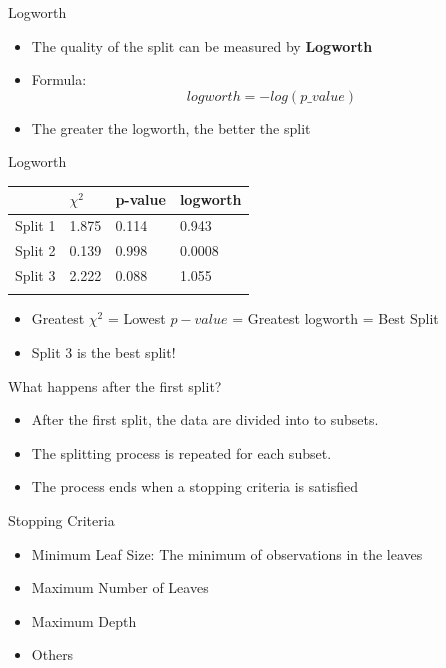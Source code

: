 \documentclass[
  ignorenonframetext,
]{beamer}
\providecommand{\tightlist}{%
  \setlength{\itemsep}{0pt}\setlength{\parskip}{0pt}}\usepackage{longtable,booktabs,array}
\begin{document}
\begin{frame}{Logworth}
\label{logworth}
\begin{itemize}
\tightlist
\item
  The quality of the split can be measured by \textbf{Logworth}
\item
  Formula: \[logworth = -log(p\text{_}value)\]
\item
  The greater the logworth, the better the split
\end{itemize}
\end{frame}

\begin{frame}{Logworth}
\label{logworth-1}
\begin{longtable}[]{@{}llll@{}}
\toprule\noalign{}
& \(\chi^2\) & p-value & logworth \\
\midrule\noalign{}
\endhead
Split 1 & 1.875 & 0.114 & 0.943 \\
Split 2 & 0.139 & 0.998 & 0.0008 \\
Split 3 & 2.222 & 0.088 & 1.055 \\
\bottomrule\noalign{}
\end{longtable}

\begin{itemize}
\item
  Greatest \(\chi^2\) = Lowest \(p-value\) = Greatest logworth = Best
  Split
\item
  Split 3 is the best split!
\end{itemize}
\end{frame}

\begin{frame}{What happens after the first split?}
\label{what-happens-after-the-first-split}
\begin{itemize}
\tightlist
\item
  After the first split, the data are divided into to subsets.
\item
  The splitting process is repeated for each subset.
\item
  The process ends when a stopping criteria is satisfied
\end{itemize}
\end{frame}

\begin{frame}{Stopping Criteria}
\label{stopping-criteria}
\begin{itemize}
\tightlist
\item
  Minimum Leaf Size: The minimum of observations in the leaves
\item
  Maximum Number of Leaves
\item
  Maximum Depth
\item
  Others
\end{itemize}
\end{frame}
\end{document}
